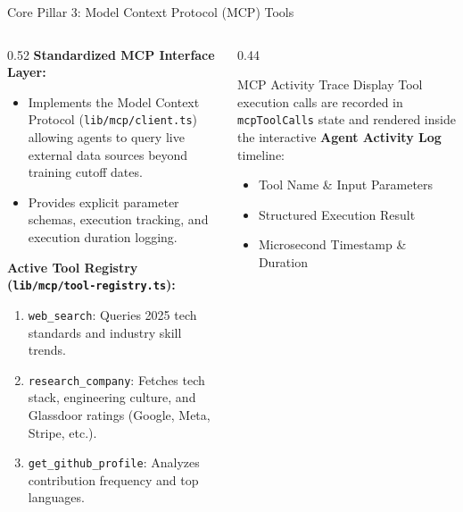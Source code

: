 \documentclass[aspectratio=169, 10pt]{beamer}
\begin{document}
\begin{frame}{Core Pillar 3: Model Context Protocol (MCP) Tools}
  \begin{columns}
    \begin{column}{0.52\textwidth}
      \textbf{Standardized MCP Interface Layer:}
      \begin{itemize}
        \item Implements the \alert{Model Context Protocol} (\texttt{lib/mcp/client.ts}) allowing agents to query live external data sources beyond training cutoff dates.
        \item Provides explicit parameter schemas, execution tracking, and execution duration logging.
      \end{itemize}
      
      \vspace{0.2cm}
      \textbf{Active Tool Registry (\texttt{lib/mcp/tool-registry.ts}):}
      \begin{enumerate}
        \item \texttt{web\_search}: Queries 2025 tech standards and industry skill trends.
        \item \texttt{research\_company}: Fetches tech stack, engineering culture, and Glassdoor ratings (Google, Meta, Stripe, etc.).
        \item \texttt{get\_github_profile}: Analyzes contribution frequency and top languages.
      \end{enumerate}
    \end{column}

    \begin{column}{0.44\textwidth}
      \begin{block}{MCP Activity Trace Display}
        \small
        Tool execution calls are recorded in \texttt{mcpToolCalls} state and rendered inside the interactive \textbf{Agent Activity Log} timeline:
        \begin{itemize}
          \item Tool Name \& Input Parameters
          \item Structured Execution Result
          \item Microsecond Timestamp \& Duration
        \end{itemize}
      \end{block}
    \end{column}
  \end{columns}
\end{frame}
\end{document}
